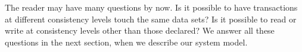 The reader may have many questions by now. Is it possible to have transactions
at different consistency levels touch the same data sets? Is it possible to read
or write at consistency levels other than those declared? We answer all these
questions in the next section, when we describe our system model.





